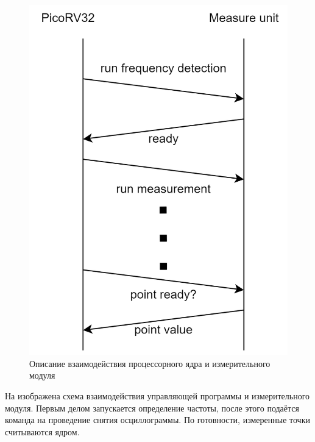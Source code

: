 \begin{figure}[ht!] 
	\center
	\includegraphics [scale=0.3] {my_folder/images//alg}
	\caption{Описание взаимодействия процессорного ядра и измерительного модуля} 
	\label{fig:alg}  
\end{figure}

\FloatBarrier

На  изображена схема взаимодействия управляющей программы и измерительного модуля.
Первым делом запускается определение частоты, после этого подаётся команда на проведение
снятия осциллограммы. По готовности, измеренные точки считываются ядром.

\newpage